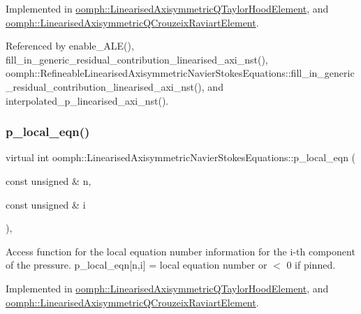 Implemented in \hyperlink{classoomph_1_1LinearisedAxisymmetricQTaylorHoodElement_a6b894b749efd765d1da22cb509b12b0f}{oomph\+::\+Linearised\+Axisymmetric\+Q\+Taylor\+Hood\+Element}, and \hyperlink{classoomph_1_1LinearisedAxisymmetricQCrouzeixRaviartElement_a63b75f226201b74bd4141674bcb39286}{oomph\+::\+Linearised\+Axisymmetric\+Q\+Crouzeix\+Raviart\+Element}.



Referenced by enable\+\_\+\+A\+L\+E(), fill\+\_\+in\+\_\+generic\+\_\+residual\+\_\+contribution\+\_\+linearised\+\_\+axi\+\_\+nst(), oomph\+::\+Refineable\+Linearised\+Axisymmetric\+Navier\+Stokes\+Equations\+::fill\+\_\+in\+\_\+generic\+\_\+residual\+\_\+contribution\+\_\+linearised\+\_\+axi\+\_\+nst(), and interpolated\+\_\+p\+\_\+linearised\+\_\+axi\+\_\+nst().

\mbox{\label{classoomph_1_1LinearisedAxisymmetricNavierStokesEquations_a78d4ea2b8f4d23f8e942dc7bcb3fa4c5}} 
\subsubsection{\texorpdfstring{p\+\_\+local\+\_\+eqn()}{p\_local\_eqn()}}
{\footnotesize\ttfamily virtual int oomph\+::\+Linearised\+Axisymmetric\+Navier\+Stokes\+Equations\+::p\+\_\+local\+\_\+eqn (\begin{DoxyParamCaption}\item[{const unsigned \&}]{n,  }\item[{const unsigned \&}]{i }\end{DoxyParamCaption})\hspace{0.3cm}{\ttfamily [protected]}, {}}



Access function for the local equation number information for the i-\/th component of the pressure. p\+\_\+local\+\_\+eqn\mbox{[}n,i\mbox{]} = local equation number or $<$ 0 if pinned. 



Implemented in \hyperlink{classoomph_1_1LinearisedAxisymmetricQTaylorHoodElement_af3c9dcb0cf542f7cdd4fd21b1f6e3e64}{oomph\+::\+Linearised\+Axisymmetric\+Q\+Taylor\+Hood\+Element}, and \hyperlink{classoomph_1_1LinearisedAxisymmetricQCrouzeixRaviartElement_ad3249306342a5b2be80bf0b73c7d2fca}{oomph\+::\+Linearised\+Axisymmetric\+Q\+Crouzeix\+Raviart\+Element}.



